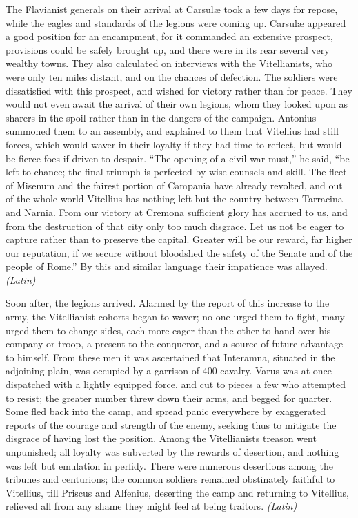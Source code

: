 The Flavianist generals on their arrival at Carsulæ took a few days for repose, while the eagles and standards of the legions were coming up. Carsulæ appeared a good position for an encampment, for it commanded an extensive prospect, provisions could be safely brought up, and there were in its rear several very wealthy towns. They also calculated on interviews with the Vitellianists, who were only ten miles distant, and on the chances of defection. The soldiers were dissatisfied with this prospect, and wished for victory rather than for peace. They would not even await the arrival of their own legions, whom they looked upon as sharers in the spoil rather than in the dangers of the campaign. Antonius summoned them to an assembly, and explained to them that Vitellius had still forces, which would waver in their loyalty if they had time to reflect, but would be fierce foes if driven to despair. ``The opening of a civil war must,'' he said, ``be left to chance; the final triumph is perfected by wise counsels and skill. The fleet of Misenum and the fairest portion of Campania have already revolted, and out of the whole world Vitellius has nothing left but the country between Tarracina and Narnia. From our victory at Cremona sufficient glory has accrued to us, and from the destruction of that city only too much disgrace. Let us not be eager to capture rather than to preserve the capital. Greater will be our reward, far higher our reputation, if we secure without bloodshed the safety of the Senate and of the people of Rome.'' By this and similar language their impatience was allayed. \emph{(Latin)}


Soon after, the legions arrived. Alarmed by the report of this increase to the army, the Vitellianist cohorts began to waver; no one urged them to fight, many urged them to change sides, each more eager than the other to hand over his company or troop, a present to the conqueror, and a source of future advantage to himself. From these men it was ascertained that Interamna, situated in the adjoining plain, was occupied by a garrison of 400 cavalry. Varus was at once dispatched with a lightly equipped force, and cut to pieces a few who attempted to resist; the greater number threw down their arms, and begged for quarter. Some fled back into the camp, and spread panic everywhere by exaggerated reports of the courage and strength of the enemy, seeking thus to mitigate the disgrace of having lost the position. Among the Vitellianists treason went unpunished; all loyalty was subverted by the rewards of desertion, and nothing was left but emulation in perfidy. There were numerous desertions among the tribunes and centurions; the common soldiers remained obstinately faithful to Vitellius, till Priscus and Alfenius, deserting the camp and returning to Vitellius, relieved all from any shame they might feel at being traitors. \emph{(Latin)}

